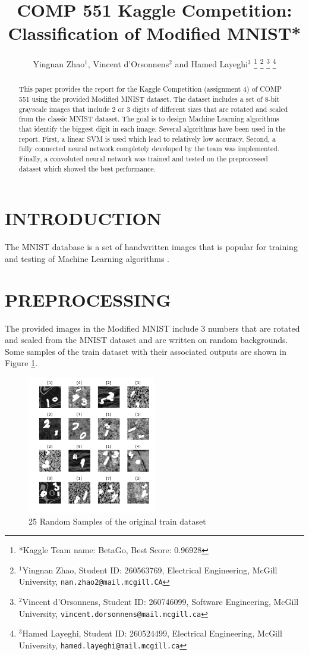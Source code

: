 \documentclass[letterpaper, 10 pt, conference]{ieeeconf}  %
\title{\LARGE \bf
COMP 551 Kaggle Competition: Classification of Modified MNIST*
}
\author{Yingnan Zhao$^{1}$, Vincent d'Orsonnens$^{2}$ and Hamed Layeghi$^{3}$%
\thanks{*Kaggle Team name: BetaGo, Best Score: 0.96928}%
\thanks{$^{1}$Yingnan Zhao, Student ID: 260563769, Electrical Engineering, 
        McGill University,
        {\tt\small nan.zhao2@mail.mcgill.CA}}%
\thanks{$^{2}$Vincent d'Orsonnens, Student ID: 260746099, Software Engineering, McGill University, 
        {\tt\small vincent.dorsonnens@mail.mcgill.ca}}%
\thanks{$^{3}$Hamed Layeghi, Student ID: 260524499, Electrical Engineering, McGill University, 
	{\tt\small hamed.layeghi@mail.mcgill.ca}}%
}
\begin{document}
\maketitle
\thispagestyle{empty}
\pagestyle{empty}


\begin{abstract}
This paper provides the report for the Kaggle Competition (assignment 4) of COMP 551 using the provided Modified MNIST dataset. The dataset includes a set of 8-bit grayscale images that include 2 or 3 digits of different sizes that are rotated and scaled from the classic MNIST dataset. The goal is to design Machine Learning algorithms that identify the biggest digit in each image. Several algorithms have been used in the report. First, a linear SVM is used which lead to relatively low accuracy. Second, a fully connected neural network completely developed by the team was implemented. Finally, a convoluted neural network was trained and tested on the preprocessed dataset which showed the best performance.  
\end{abstract}


\section{INTRODUCTION}

The MNIST database \cite{MNISTcreators} is a set of handwritten images that is popular for training and testing of Machine Learning algorithms \cite{wiki:MNIST}.

\section{PREPROCESSING}
The provided images in the Modified MNIST include 3 numbers that are rotated and scaled from the MNIST dataset and are written on random backgrounds.
Some samples of the train dataset with their associated outputs are shown in Figure \ref{fig:original}.
\begin{figure}[h]
	\begin{center}
		\includegraphics[width=0.5\textwidth]{figures/originalDataset.pdf}  %
		\caption{25 Random Samples of the original train dataset}
		\label{fig:original}
	\end{center}
\end{figure}
\end{document}
